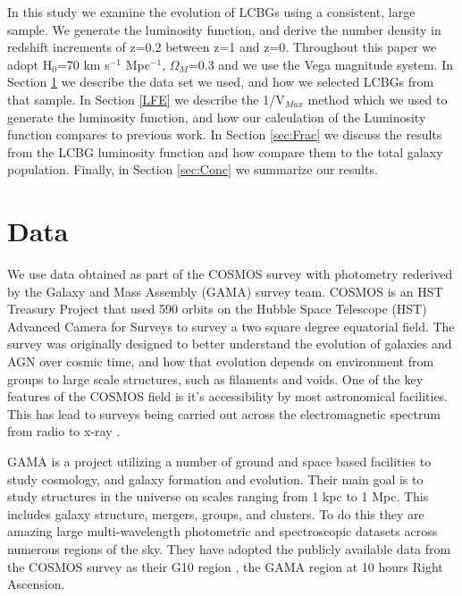 \documentclass[manuscript]{aastex61}
\begin{document}
In this study we examine the evolution of LCBGs using a consistent, large sample. We generate the luminosity function, and derive the number density in redshift increments of z=0.2 between z=1 and z=0. Throughout this paper we adopt H$_{0}$=70 km s$^{-1}$ Mpc$^{-1}$, $\Omega_{M}$=0.3 and we use the Vega magnitude system. In Section \ref{obs} we describe the data set we used, and how we selected LCBGs from that sample. In Section \ref{LFE} we describe the 1/V$_{Max}$ method which we used to generate the luminosity function, and how our calculation of the Luminosity function compares to previous work. In Section \ref{sec:Frac} we discuss the results from the LCBG luminosity function and how compare them to the total galaxy population. Finally, in Section \ref{sec:Conc} we summarize our results. 



\section{Data}
\label{obs}
We use data obtained as part of the COSMOS survey with photometry rederived by the Galaxy and Mass Assembly (GAMA) survey team. COSMOS is an HST Treasury Project \citep{2007ApJS..172....1S} that used 590 orbits on the Hubble Space Telescope (HST) Advanced Camera for Surveys to survey a two square degree equatorial field. The survey was originally designed to better understand the evolution of galaxies and AGN over cosmic time, and how that evolution depends on environment from groups to large scale structures, such as filaments and voids. One of the key features of the COSMOS field is it's accessibility by most astronomical facilities. This has lead to surveys being carried out across the electromagnetic spectrum from radio \citep{2017A&A...602A...1S} to x-ray \citep{2016ApJ...819...62C}. 

GAMA is a project utilizing a number of ground and space based facilities to study cosmology, and galaxy formation and evolution. Their main goal is to study structures in the universe on scales ranging from 1 kpc to 1 Mpc. This includes galaxy structure, mergers, groups, and clusters. To do this they are amazing large multi-wavelength photometric and spectroscopic datasets across numerous regions of the sky. They have adopted the publicly available data from the COSMOS survey as their G10 region \citep{2015MNRAS.447.1014D,2017MNRAS.464.1569A}, the GAMA region at 10 hours Right Ascension.  
\end{document}
